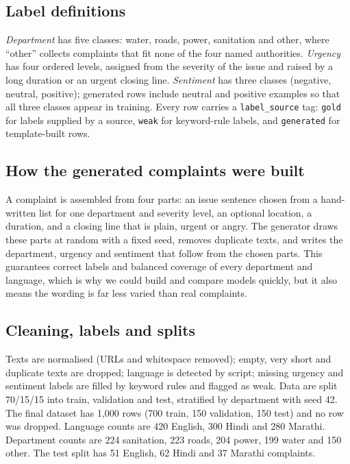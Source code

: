 \documentclass[conference]{IEEEtran}
\begin{document}
\subsection{Label definitions}
\emph{Department} has five classes: water, roads, power, sanitation and other, where ``other'' collects complaints that fit none of the four named authorities.
\emph{Urgency} has four ordered levels, assigned from the severity of the issue and raised by a long duration or an urgent closing line.
\emph{Sentiment} has three classes (negative, neutral, positive); generated rows include neutral and positive examples so that all three classes appear in training.
Every row carries a \texttt{label\_source} tag: \texttt{gold} for labels supplied by a source, \texttt{weak} for keyword-rule labels, and \texttt{generated} for template-built rows.
\subsection{How the generated complaints were built}
A complaint is assembled from four parts: an issue sentence chosen from a hand-written list for one department and severity level, an optional location, a duration, and a closing line that is plain, urgent or angry.
The generator draws these parts at random with a fixed seed, removes duplicate texts, and writes the department, urgency and sentiment that follow from the chosen parts.
This guarantees correct labels and balanced coverage of every department and language, which is why we could build and compare models quickly, but it also means the wording is far less varied than real complaints.

\subsection{Cleaning, labels and splits}
Texts are normalised (URLs and whitespace removed); empty, very short and duplicate texts are dropped; language is detected by script;
missing urgency and sentiment labels are filled by keyword rules and flagged as weak. Data are split 70/15/15 into train, validation and test,
stratified by department with seed 42. The final dataset has 1{,}000 rows (700 train, 150 validation, 150 test) and no row was dropped. Language counts are 420 English, 300 Hindi and 280 Marathi. Department counts are 224 sanitation, 223 roads, 204 power, 199 water and 150 other. The test split has 51 English, 62 Hindi and 37 Marathi complaints.
\end{document}
